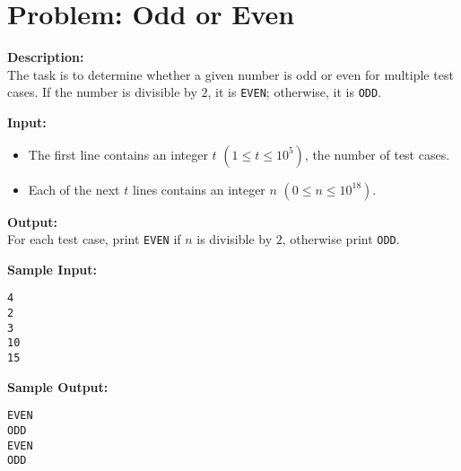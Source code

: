 \documentclass[12pt]{article}
\begin{document}
\section*{Problem: Odd or Even}

\textbf{Description:} \\
The task is to determine whether a given number is odd or even for multiple test cases.  
If the number is divisible by $2$, it is \texttt{EVEN}; otherwise, it is \texttt{ODD}.

\textbf{Input:}
\begin{itemize}
    \item The first line contains an integer $t$ $(1 \leq t \leq 10^5)$, the number of test cases.
    \item Each of the next $t$ lines contains an integer $n$ $(0 \leq n \leq 10^{18})$.
\end{itemize}

\textbf{Output:} \\
For each test case, print \texttt{EVEN} if $n$ is divisible by $2$, otherwise print \texttt{ODD}.

\textbf{Sample Input:}
\begin{verbatim}
4
2
3
10
15
\end{verbatim}

\textbf{Sample Output:}
\begin{verbatim}
EVEN
ODD
EVEN
ODD
\end{verbatim}
\end{document}

